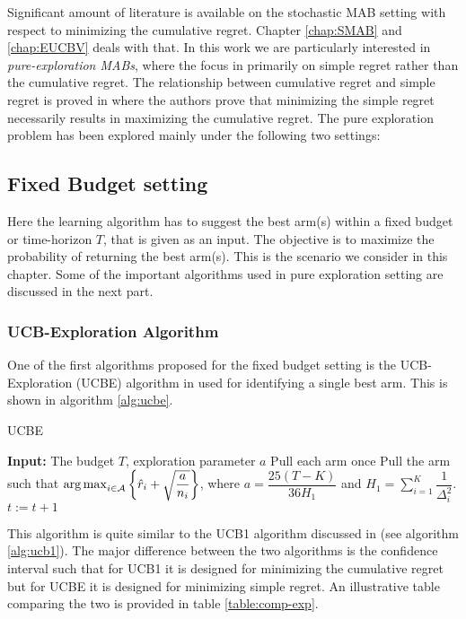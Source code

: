 Significant amount of literature is available on the stochastic MAB setting with respect to minimizing the cumulative regret. Chapter \ref{chap:SMAB} and \ref{chap:EUCBV} deals with that. In this work we are particularly interested in \emph{pure-exploration MABs},  where the focus in primarily on simple regret rather than the cumulative regret. The relationship between cumulative regret and simple regret is proved in \citet{bubeck2011pure} where the authors prove that minimizing the simple regret necessarily results in maximizing the cumulative regret.
The pure exploration problem has been explored  mainly under the following two settings:
	
\subsection{Fixed Budget setting} 

Here the learning algorithm has to suggest the best arm(s) within a fixed budget or time-horizon $T$, that is given as an input. The objective is to maximize the probability of returning the best arm(s).  This is the scenario we consider in this chapter. Some of the important algorithms used in pure exploration setting are discussed in the next part.

\subsubsection{UCB-Exploration Algorithm}

One of the first algorithms proposed for the fixed budget setting is the UCB-Exploration (UCBE) algorithm in \citet{audibert2010best} used for identifying a single best arm. This is shown in algorithm \ref{alg:ucbe}.


\begin{algorithm}[!ht]
\caption{UCBE}
\label{alg:ucbe}
\begin{algorithmic}[1]
\State \textbf{Input: } The budget $T$, exploration parameter $a$
\State Pull each arm once
\State Pull the arm such that $\operatorname*{arg\,max}_{i\in \mathcal{A}}\bigg\lbrace\hat{r}_{i} + \sqrt{\dfrac{a}{n_i}}\bigg\rbrace$, where $a = \dfrac{25(T-K)}{36 H_1}$ and $H_1 = \sum_{i=1}^{K}\dfrac{1}{\Delta_i^2}$.
\State $t:=t+1 $
\EndFor
\end{algorithmic}
\end{algorithm}

This algorithm is quite similar to the UCB1 algorithm discussed in \citet{auer2002finite} (see algorithm \ref{alg:ucb1}). The major difference between the two algorithms is the confidence interval such that for UCB1 it is designed for minimizing the cumulative regret but for UCBE it is designed for minimizing simple regret. An illustrative table comparing the two is provided in table \ref{table:comp-exp}.

